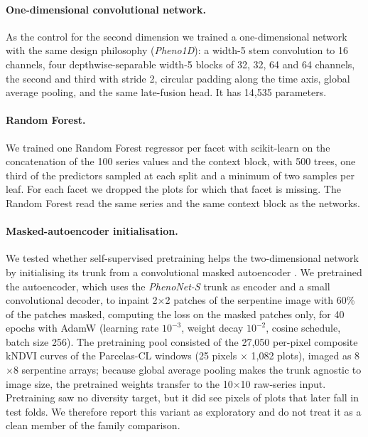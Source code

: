 \documentclass[preprint,12pt]{elsarticle}
\begin{document}
\paragraph{One-dimensional convolutional network.}
As the control for the second dimension we trained a one-dimensional network with the same
design philosophy (\emph{Pheno1D}): a width-5 stem convolution to 16 channels, four
depthwise-separable width-5 blocks of 32, 32, 64 and 64 channels, the second and third with
stride 2, circular padding along the time axis, global average pooling, and the same
late-fusion head. It has 14,535 parameters.

\paragraph{Random Forest.}
We trained one Random Forest regressor \citep{breiman2001random} per facet with
scikit-learn \citep{pedregosa2011scikit} on the concatenation of the 100 series values and
the context block, with 500 trees, one third of the predictors sampled at each split and a
minimum of two samples per leaf. For each facet we dropped the plots for which that facet
is missing. The Random Forest read the same series and the same context block as the
networks.

\paragraph{Masked-autoencoder initialisation.}
We tested whether self-supervised pretraining helps the two-dimensional network by
initialising its trunk from a convolutional masked autoencoder \citep{he2022masked}. We
pretrained the autoencoder, which uses the \emph{PhenoNet-S} trunk as encoder and a small
convolutional decoder, to inpaint 2$\times$2 patches of the serpentine image with 60\% of
the patches masked, computing the loss on the masked patches only, for 40 epochs with AdamW
(learning rate $10^{-3}$, weight decay $10^{-2}$, cosine schedule, batch size 256). The
pretraining pool consisted of the 27,050 per-pixel composite kNDVI curves of the
Parcelas-CL windows (25 pixels $\times$ 1,082 plots), imaged as 8$\times$8 serpentine
arrays; because global average pooling makes the trunk agnostic to image size, the
pretrained weights transfer to the 10$\times$10 raw-series input. Pretraining saw no
diversity target, but it did see pixels of plots that later fall in test folds. We
therefore report this variant as exploratory and do not treat it as a clean member of the
family comparison.
\end{document}
